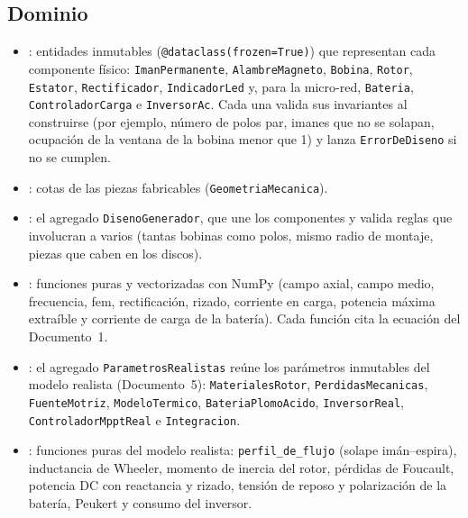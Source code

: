 \documentclass[11pt]{article}
\begin{document}
\subsection{Dominio}
\begin{itemize}
  \item {}: entidades inmutables (\texttt{@dataclass(frozen=True)}) que representan cada
        componente físico: \texttt{ImanPermanente}, \texttt{AlambreMagneto}, \texttt{Bobina}, \texttt{Rotor},
        \texttt{Estator}, \texttt{Rectificador}, \texttt{IndicadorLed} y, para la micro-red, \texttt{Bateria},
        \texttt{ControladorCarga} e \texttt{InversorAc}. Cada una valida sus invariantes al
        construirse (por ejemplo, número de polos par, imanes que no se solapan, ocupación de la ventana de la
        bobina menor que 1) y lanza \texttt{ErrorDeDiseno} si no se cumplen.
  \item {}: cotas de las piezas fabricables (\texttt{GeometriaMecanica}).
  \item {}: el agregado \texttt{DisenoGenerador}, que une los componentes y valida reglas que
        involucran a varios (tantas bobinas como polos, mismo radio de montaje, piezas que caben en los discos).
  \item {}: funciones puras y vectorizadas con NumPy (campo axial, campo medio, frecuencia,
        fem, rectificación, rizado, corriente en carga, potencia máxima extraíble y corriente de carga de la
        batería). Cada función cita la ecuación del Documento~1.
  \item \begin{sloppypar}: el agregado \texttt{ParametrosRealistas} reúne los parámetros
        inmutables del modelo realista (Documento~5): \texttt{MaterialesRotor}, \texttt{PerdidasMecanicas},
        \texttt{FuenteMotriz}, \texttt{ModeloTermico}, \texttt{BateriaPlomoAcido}, \texttt{InversorReal},
        \texttt{ControladorMpptReal} e \texttt{Integracion}.\end{sloppypar}
  \item {}: funciones puras del modelo realista: \texttt{perfil\_de\_flujo} (solape
        imán--espira), inductancia de Wheeler, momento de inercia del rotor, pérdidas de Foucault,
        potencia DC con reactancia y rizado, tensión de reposo y polarización de la batería, Peukert y consumo del
        inversor.
\end{itemize}
\end{document}

